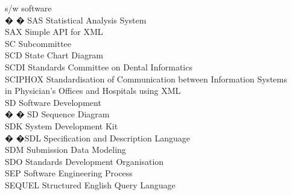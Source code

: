 \begin{tabbing}
    \>s/w \>\>software\\


� � \>SAS \>\>Statistical Analysis System\\



    \>SAX \>\>Simple API for XML\\

    \>SC \>\>Subcommittee\\

    \>SCD \>\>State Chart Diagram\\

    \>SCDI \>\>Standards Committee on Dental Informatics\\

    \>SCIPHOX \>\>Standardisation of Communication between Information Systems\\
        \>\>\>in Physician's Offices and Hospitals using XML\\


    \>SD \>\>Software Development\\

� � \>SD \>\>Sequence Diagram\\

    \>SDK \>\>System Development Kit\\

 � �\>SDL \>\>Specification and Description Language\\


    \>SDM \>\>Submission Data Modeling\\

    \>SDO \>\>Standards Development Organisation\\


    \>SEP \>\>Software Engineering Process\\

    \>SEQUEL \>\>Structured English Query Language\\


\end{tabbing}
